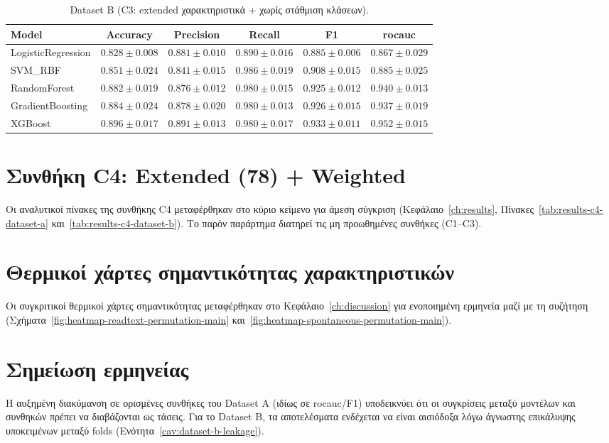 \begin{table}[H]
    \centering
    \caption{Dataset B (C3: extended χαρακτηριστικά + χωρίς στάθμιση κλάσεων).}
    \label{tab:appendix-c3-dataset-b}
    \scriptsize
    \begin{tabular}{@{}lccccc@{}}
        \toprule
        Model & Accuracy & Precision & Recall & F1 & \gls{rocauc} \\
        \midrule
        LogisticRegression & $0.828 \pm 0.008$ & $0.881 \pm 0.010$ & $0.890 \pm 0.016$ & $0.885 \pm 0.006$ & $0.867 \pm 0.029$ \\
        SVM\_RBF & $0.851 \pm 0.024$ & $0.841 \pm 0.015$ & $0.986 \pm 0.019$ & $0.908 \pm 0.015$ & $0.885 \pm 0.025$ \\
        RandomForest & $0.882 \pm 0.019$ & $0.876 \pm 0.012$ & $0.980 \pm 0.015$ & $0.925 \pm 0.012$ & $0.940 \pm 0.013$ \\
        GradientBoosting & $0.884 \pm 0.024$ & $0.878 \pm 0.020$ & $0.980 \pm 0.013$ & $0.926 \pm 0.015$ & $0.937 \pm 0.019$ \\
        XGBoost & $0.896 \pm 0.017$ & $0.891 \pm 0.013$ & $0.980 \pm 0.017$ & $0.933 \pm 0.011$ & $0.952 \pm 0.015$ \\
        \bottomrule
    \end{tabular}
\end{table}

\section{Συνθήκη C4: Extended (78) + Weighted}

Οι αναλυτικοί πίνακες της συνθήκης C4 μεταφέρθηκαν στο κύριο κείμενο για άμεση σύγκριση (Κεφάλαιο~\ref{ch:results}, Πίνακες~\ref{tab:results-c4-dataset-a} και~\ref{tab:results-c4-dataset-b}). Το παρόν παράρτημα διατηρεί τις μη προωθημένες συνθήκες (C1--C3).

\endgroup

\section{Θερμικοί χάρτες σημαντικότητας χαρακτηριστικών}

Οι συγκριτικοί θερμικοί χάρτες σημαντικότητας μεταφέρθηκαν στο Κεφάλαιο~\ref{ch:discussion} για ενοποιημένη ερμηνεία μαζί με τη συζήτηση (Σχήματα~\ref{fig:heatmap-readtext-permutation-main} και~\ref{fig:heatmap-spontaneous-permutation-main}).

\section{Σημείωση ερμηνείας}

Η αυξημένη διακύμανση σε ορισμένες συνθήκες του Dataset A (ιδίως σε \gls{rocauc}/F1) υποδεικνύει ότι οι συγκρίσεις μεταξύ μοντέλων και συνθηκών πρέπει να διαβάζονται ως τάσεις. Για το Dataset B, τα αποτελέσματα ενδέχεται να είναι αισιόδοξα λόγω άγνωστης επικάλυψης υποκειμένων μεταξύ folds (Ενότητα~\ref{cav:dataset-b-leakage}).
